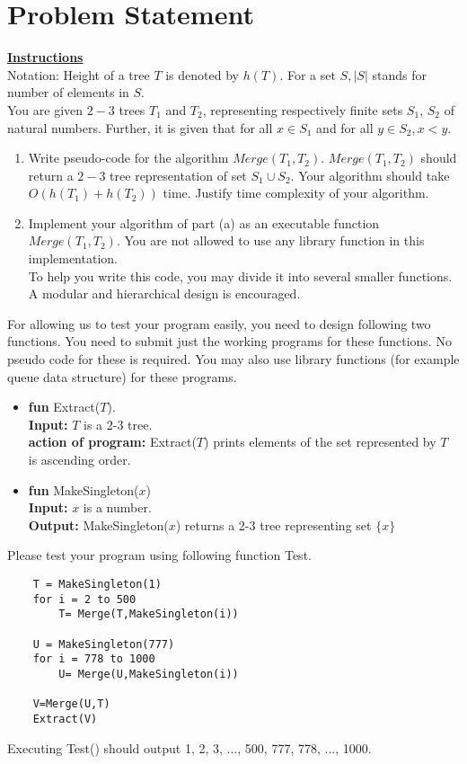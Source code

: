 

\section{Problem Statement}\label{Problem}

\centering \textbf{\underline{Instructions}} \\ \justifying
Notation: Height of a tree $T$ is denoted by $h(T)$. For a set $S, |S|$ stands for number of elements in $S$. \\
You are given $2-3$ trees $T_{1}$ and $T_{2}$, representing respectively finite sets $S_{1}$, $S_{2}$ of natural numbers. Further, it is given that for all $x \in S_{1}$ and for all $y \in S_{2}, x < y$.
\begin{enumerate}[label=(\alph*)]
    \item Write pseudo-code for the algorithm $Merge(T_{1}, T_{2})$. $Merge(T_{1}, T_{2})$ should return a $2-3$ tree representation of set $S_{1} \cup S_{2}$. Your algorithm should take $O(h(T_{1}) + h(T_{2}))$ time. Justify time complexity of your algorithm.
    \item Implement your algorithm of part (a) as an executable function $Merge(T_{1}, T_{2})$. You are not allowed to use any library function in this implementation. \\
    To help you write this code, you may divide it into several smaller functions. A modular and hierarchical design is encouraged.
\end{enumerate}
For allowing us to test your program easily, you need to design following two functions. You need to submit just the working programs for these functions. No pseudo code for these is required. You may also use library functions (for example queue data structure) for these programs.

\begin{itemize}
    \item   \textbf{fun} Extract($T$). \\
            \textbf{Input:} $T$ is a 2-3 tree. \\ 
            \textbf{action of program:} Extract($T$) prints elements of the set represented by $T$ is ascending order.
    
    \item   \textbf{fun} MakeSingleton($x$) \\
            \textbf{Input:} $x$ is a number. \\
            \textbf{Output:} MakeSingleton($x$) returns a 2-3 tree representing set $\{x\}$
\end{itemize}
Please test your program using following function Test.
\begin{lstlisting}
    T = MakeSingleton(1)
    for i = 2 to 500
        T= Merge(T,MakeSingleton(i))
        
    U = MakeSingleton(777)
    for i = 778 to 1000
        U= Merge(U,MakeSingleton(i))
        
    V=Merge(U,T)
    Extract(V)
\end{lstlisting}
Executing Test() should output 1, 2, 3, ..., 500, 777, 778, ..., 1000.